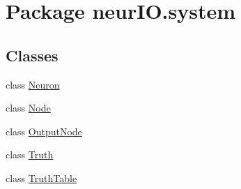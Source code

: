 \hypertarget{namespaceneur_i_o_1_1system}{}\section{Package neur\+I\+O.\+system}
\label{namespaceneur_i_o_1_1system}
\subsection*{Classes}
\begin{DoxyCompactItemize}
\item 
class \hyperlink{classneur_i_o_1_1system_1_1_neuron}{Neuron}
\item 
class \hyperlink{classneur_i_o_1_1system_1_1_node}{Node}
\item 
class \hyperlink{classneur_i_o_1_1system_1_1_output_node}{Output\+Node}
\item 
class \hyperlink{classneur_i_o_1_1system_1_1_truth}{Truth}
\item 
class \hyperlink{classneur_i_o_1_1system_1_1_truth_table}{Truth\+Table}
\end{DoxyCompactItemize}
